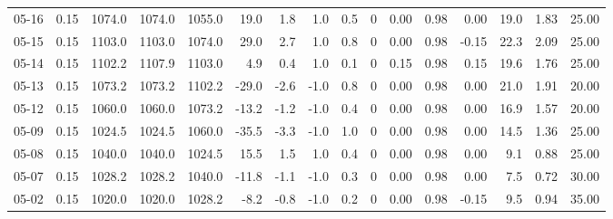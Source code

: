 \begin{threeparttable}
{\begin{tabular}{lrrrrrrrrrrrrrrr}
  05-16 &     0.15 & 1074.0 & 1074.0 & 1055.0 &       19.0 &            1.8 &                      1.0 &                 0.5 &              0 &       0.00 &      0.98 &           0.00 &             19.0 &            1.83 &                  25.00 \\
  05-15 &     0.15 & 1103.0 & 1103.0 & 1074.0 &       29.0 &            2.7 &                      1.0 &                 0.8 &              0 &       0.00 &      0.98 &          -0.15 &             22.3 &            2.09 &                  25.00 \\
  05-14 &     0.15 & 1102.2 & 1107.9 & 1103.0 &        4.9 &            0.4 &                      1.0 &                 0.1 &              0 &       0.15 &      0.98 &           0.15 &             19.6 &            1.76 &                  25.00 \\
  05-13 &     0.15 & 1073.2 & 1073.2 & 1102.2 &      -29.0 &           -2.6 &                     -1.0 &                 0.8 &              0 &       0.00 &      0.98 &           0.00 &             21.0 &            1.91 &                  20.00 \\
  05-12 &     0.15 & 1060.0 & 1060.0 & 1073.2 &      -13.2 &           -1.2 &                     -1.0 &                 0.4 &              0 &       0.00 &      0.98 &           0.00 &             16.9 &            1.57 &                  20.00 \\
  05-09 &     0.15 & 1024.5 & 1024.5 & 1060.0 &      -35.5 &           -3.3 &                     -1.0 &                 1.0 &              0 &       0.00 &      0.98 &           0.00 &             14.5 &            1.36 &                  25.00 \\
  05-08 &     0.15 & 1040.0 & 1040.0 & 1024.5 &       15.5 &            1.5 &                      1.0 &                 0.4 &              0 &       0.00 &      0.98 &           0.00 &              9.1 &            0.88 &                  25.00 \\
  05-07 &     0.15 & 1028.2 & 1028.2 & 1040.0 &      -11.8 &           -1.1 &                     -1.0 &                 0.3 &              0 &       0.00 &      0.98 &           0.00 &              7.5 &            0.72 &                  30.00 \\
  05-02 &     0.15 & 1020.0 & 1020.0 & 1028.2 &       -8.2 &           -0.8 &                     -1.0 &                 0.2 &              0 &       0.00 &      0.98 &          -0.15 &              9.5 &            0.94 &                  35.00 \\

\end{tabular}}
\end{threeparttable}
